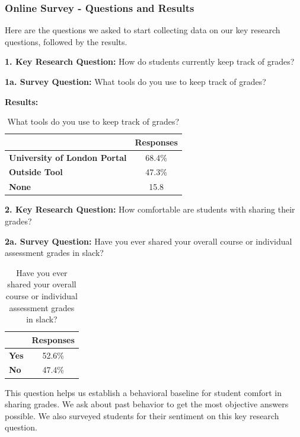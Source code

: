\subsubsection{Online Survey - Questions and Results}
Here are the questions we asked to start collecting data on our key research questions, followed by the results.

\textbf{1. Key Research Question:} How do students currently keep track of grades?
\smallskip

\textbf{1a. Survey Question:} What tools do you use to keep track of grades?
\smallskip

\textbf{Results:}

\begin{table}[H]
\centering
\begin{tabular}{@{}lc@{}}
\toprule
                  & {\textbf{Responses}}  \\ \midrule
\textbf{University of London Portal}    & 68.4\%    \\
\textbf{Outside Tool}                   & 47.3\%    \\
\textbf{None}                           & 15.8      \\ \bottomrule
\end{tabular}
\caption{What tools do you use to keep track of grades?}
\label{survey1a}
\end{table}

\textbf{2. Key Research Question:} How comfortable are students with sharing their grades?
\smallskip

\textbf{2a. Survey Question:} Have you ever shared your overall course or individual assessment grades in slack?
\smallskip

\begin{table}[H]
\centering
\begin{tabular}{@{}lc@{}}
\toprule
                  & {\textbf{Responses}}  \\ \midrule
\textbf{Yes}    & 52.6\%    \\
\textbf{No}     & 47.4\%    \\ \bottomrule
\end{tabular}
\caption{Have you ever shared your overall course or individual assessment grades in slack?}
\label{survey2a}
\end{table}

This question helps us establish a behavioral baseline for student comfort in sharing grades. We ask about past behavior to get the most objective answers possible. We also surveyed students for their sentiment on this key research question.
\medskip

